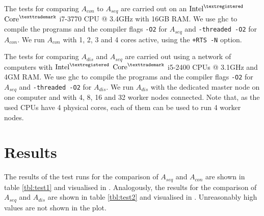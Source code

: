 The tests for comparing $A_{con}$ to $A_{seq}$ are carried out on an $\text{Intel}^{\textregistered}$ $\text{Core}^{\texttrademark}$ i7-3770 CPU @ 3.4GHz with 16GB RAM. We use \textsf{ghc} to compile the programs and the compiler flags \texttt{-O2} for $A_{seq}$ and \texttt{-threaded -O2} for $A_{con}$. We run $A_{con}$ with 1, 2, 3 and 4 cores active, using the \texttt{+RTS -N} option.

The tests for comparing $A_{dis}$ and $A_{seq}$ are carried out using a network of computers with $\text{Intel}^{\textregistered}$ $\text{Core}^{\texttrademark}$ i5-2400 CPUs @ 3.1GHz and 4GM RAM. We use \textsf{ghc} to compile the programs and the compiler flags \texttt{-O2} for $A_{seq}$ and \texttt{-threaded -O2} for $A_{dis}$. We run $A_{dis}$ with the dedicated master node on one computer and with 4, 8, 16 and 32 worker nodes connected. Note that, as the used CPUs have 4 physical cores, each of them can be used to run 4 worker nodes.

\vspace*{-1em}
\section{Results}
The results of the test runs for the comparison of $A_{seq}$ and $A_{con}$ are shown in table \ref{tbl:test1} and visualised in . Analogously, the results for the comparison of $A_{seq}$ and $A_{dis}$ are shown in table \ref{tbl:test2} and visualised in . Unreasonably high values are not shown in the plot.

\vspace*{-1em}

